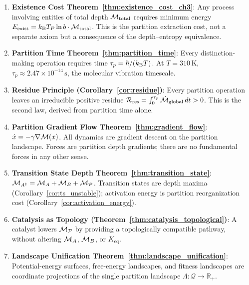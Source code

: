 \begin{chapterbox}[title=Chapter 3 --- Key Results Established]
\begin{enumerate}[label=\textbf{\arabic*.}]
  \item \textbf{Existence Cost Theorem~\ref{thm:existence_cost_ch3}}:
        Any process involving entities of total depth $\mathcal{M}_{\mathrm{total}}$
        requires minimum energy $E_{\mathrm{exist}} = k_{\mathrm{B}} T_P \ln b \cdot \mathcal{M}_{\mathrm{total}}$.
        This is the partition extraction cost, not a separate axiom but a
        consequence of the depth--entropy equivalence.

  \item \textbf{Partition Time Theorem~\ref{thm:partition_time}}:
        Every distinction-making operation requires time $\tau_p = \hbar/(k_{\mathrm{B}} T)$.
        At $T = 310\,\mathrm{K}$, $\tau_p \approx 2.47 \times 10^{-14}\,\mathrm{s}$,
        the molecular vibration timescale.

  \item \textbf{Residue Principle (Corollary~\ref{cor:residue})}:
        Every partition operation leaves an irreducible positive residue
        $\mathcal{R}_{\mathrm{res}} = \int_0^{\tau_p} \dot{\mathcal{M}}_{\mathrm{global}}\, dt > 0$.
        This is the second law, derived from partition time alone.

  \item \textbf{Partition Gradient Flow Theorem~\ref{thm:gradient_flow}}:
        $\dot{x} = -\gamma\nabla\mathcal{M}(x)$. All dynamics are gradient descent on
        the partition landscape. Forces are partition depth gradients;
        there are no fundamental forces in any other sense.

  \item \textbf{Transition State Depth Theorem~\ref{thm:transition_state}}:
        $\mathcal{M}_{A^\ddagger} = \mathcal{M}_A + \mathcal{M}_B + \mathcal{M}_{\mathcal{P}}$.
        Transition states are depth maxima (Corollary~\ref{cor:ts_unstable});
        activation energy is partition reorganization cost
        (Corollary~\ref{cor:activation_energy}).

  \item \textbf{Catalysis as Topology (Theorem~\ref{thm:catalysis_topological})}:
        A catalyst lowers $\mathcal{M}_{\mathcal{P}}$ by providing a topologically
        compatible pathway, without altering $\mathcal{M}_A$, $\mathcal{M}_B$, or
        $K_{\mathrm{eq}}$.

  \item \textbf{Landscape Unification Theorem~\ref{thm:landscape_unification}}:
        Potential-energy surfaces, free-energy landscapes, and fitness
        landscapes are coordinate projections of the single partition landscape
        $\Lambda: \mathcal{Q} \to \mathbb{R}_+$.


\end{enumerate}
\end{chapterbox}
